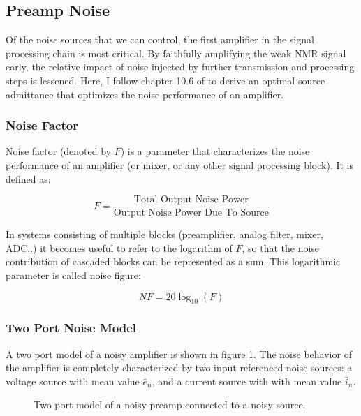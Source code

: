 \subsection{Preamp Noise}
Of the noise sources that we can control, the first amplifier in the signal processing chain is most critical. By
faithfully amplifying the weak NMR signal early, the relative impact of noise injected by further transmission and
processing steps is lessened. Here, I follow chapter 10.6 of \cite{lee2004} to derive an optimal source admittance that
optimizes the noise performance of an amplifier.

\subsubsection{Noise Factor}
Noise factor (denoted by $F$) is a parameter that characterizes the noise performance of an amplifier (or mixer, or any other signal
processing block).  It is defined as:

\begin{equation}\label{eq:noise_factor}
    F = \frac{\text{Total Output Noise Power}}{\text{Output Noise Power Due To Source}}
\end{equation}

In systems consisting of multiple blocks (preamplifier, analog filter, mixer, ADC..) it becomes useful to refer to the
logarithm of $F$, so that the noise contribution of cascaded blocks can be represented as a sum. This logarithmic
parameter is called noise figure:

\begin{equation}\label{eq:noise_figure}
    NF = 20 \log_{10}(F)
\end{equation}

\subsubsection{Two Port Noise Model}

A two port model of a noisy amplifier is shown in figure \ref{fig:2port_noise}. The noise behavior of the amplifier is
completely characterized by two input referenced noise sources: a voltage source with mean value $\bar{e}_n$, and a
current source with with mean value $\bar{i}_n$.

\begin{figure}
    \centering
    
    \caption{Two port model of a noisy preamp connected to a noisy source.}
    \label{fig:2port_noise}
\end{figure}

